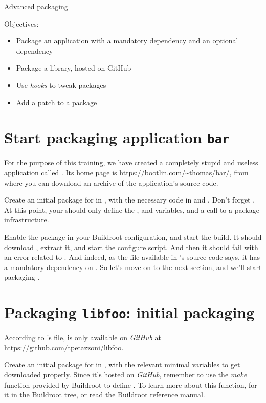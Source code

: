 \subchapter
{Advanced packaging}
{Objectives:
  \begin{itemize}
  \item Package an application with a mandatory dependency and an
    optional dependency
  \item Package a library, hosted on GitHub
  \item Use {\em hooks} to tweak packages
  \item Add a patch to a package
  \end{itemize}
}

\section{Start packaging application {\tt bar}}

For the purpose of this training, we have created a completely stupid
and useless application called . Its home page is
\url{https://bootlin.com/~thomas/bar/}, from where you can
download an archive of the application's source code.

Create an initial package for  in , with
the necessary code in  and
. Don't forget
. At this point, your  should
only define the ,  and
 variables, and a call to a package infrastructure.

Enable the  package in your Buildroot configuration, and
start the build. It should download , extract it, and start
the configure script. And then it should fail with an error related to
. And indeed, as the  file available in
's source code says, it has a mandatory dependency on
. So let's move on to the next section, and we'll start
packaging .

\section{Packaging {\tt libfoo}: initial packaging}

According to 's  file,  is only
available on {\em GitHub} at
\url{https://github.com/tpetazzoni/libfoo}.

Create an initial package for  in ,
with the relevant minimal variables to get  downloaded
properly. Since it's hosted on {\em GitHub}, remember to use the
 {\em make} function provided by Buildroot to define
. To learn more about this function,  for
it in the Buildroot tree, or read the Buildroot reference manual.


